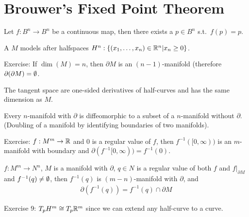 \documentclass[12pt,class=article,crop=false]{standalone}
\begin{document}
\section{Brouwer's Fixed Point Theorem}
\begin{thm}
Let $ f: B^{n} \to B^{n}$ be a continuous map, then there exists a $ p \in B^{n}$ s.t.\ $ f(p) = p$.
\end{thm}

\begin{defn}
A  $ M$ models after halfspaces $ H^{n}: \{(x_1,\ldots,x_n) \in \mathbb{R}^{n}| x_n \geq 0\} $. 
\end{defn}

Exercise: If $ \dim(M) =n$, then  $ \partial M$ is an $ (n-1)$-manifold (therefore $ \partial ( \partial M) = \emptyset$.

The tangent space are one-sided derivatives of half-curves and has the same dimension as $ M$.

Every  $ n$-manifold with  $ \partial $ is diffeomorphic to a subset of a $ n$-manifold without  $ \partial $. (Doubling of a manifold by identifying boundaries of two manifolds). 

Exercise: $ f : M^{m} \to \mathbb{R}$ and $ 0$ is a regular value of  $ f$, then  $ f^{-1}([0,\infty))$ is an $ m$-manifold with boundary and  $ \partial (f^{-1}[0,\infty)) = f^{-1}(0)$.

\begin{thm}
$ f: M^{m} \to N^{n}$, $ M$ is a manifold with  $ \partial $, $ q \in N$ is a regular value of both $ f$ and  $ f|_{ \partial M}$ and $ f^{-1}(q)\neq \emptyset$, then $ f^{-1}(q)$ is $ (m-n)$-manifold with  $ \partial $, and
\begin{align*}
	\partial (f^{-1}(q)) = f^{-1}(q) \cap \partial M
\end{align*}
\end{thm}

Exercise 9: $ T_p H^{m} \cong T_p \mathbb{R}^{m}$ since we can extend any half-curve to a curve.
\end{document}
